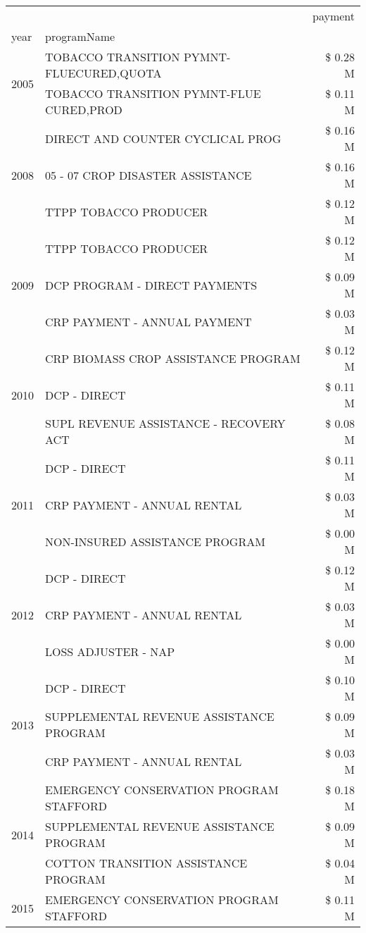 \begin{tabular}{llr}
\toprule
 &  & payment \\
year & programName &  \\
\midrule
\multirow[t]{2}{*}{2005} & TOBACCO TRANSITION PYMNT-FLUECURED,QUOTA & \$ 0.28 M \\
 & TOBACCO TRANSITION PYMNT-FLUE CURED,PROD & \$ 0.11 M \\
\cline{1-3}
\multirow[t]{3}{*}{2008} & DIRECT AND COUNTER CYCLICAL PROG & \$ 0.16 M \\
 & 05 - 07 CROP DISASTER ASSISTANCE & \$ 0.16 M \\
 & TTPP TOBACCO PRODUCER & \$ 0.12 M \\
\cline{1-3}
\multirow[t]{3}{*}{2009} & TTPP TOBACCO PRODUCER & \$ 0.12 M \\
 & DCP PROGRAM - DIRECT PAYMENTS & \$ 0.09 M \\
 & CRP PAYMENT - ANNUAL PAYMENT & \$ 0.03 M \\
\cline{1-3}
\multirow[t]{3}{*}{2010} & CRP BIOMASS CROP ASSISTANCE PROGRAM & \$ 0.12 M \\
 & DCP - DIRECT & \$ 0.11 M \\
 & SUPL REVENUE ASSISTANCE - RECOVERY ACT & \$ 0.08 M \\
\cline{1-3}
\multirow[t]{3}{*}{2011} & DCP - DIRECT & \$ 0.11 M \\
 & CRP PAYMENT - ANNUAL RENTAL & \$ 0.03 M \\
 & NON-INSURED ASSISTANCE PROGRAM & \$ 0.00 M \\
\cline{1-3}
\multirow[t]{3}{*}{2012} & DCP - DIRECT & \$ 0.12 M \\
 & CRP PAYMENT - ANNUAL RENTAL & \$ 0.03 M \\
 & LOSS ADJUSTER - NAP & \$ 0.00 M \\
\cline{1-3}
\multirow[t]{3}{*}{2013} & DCP - DIRECT & \$ 0.10 M \\
 & SUPPLEMENTAL REVENUE ASSISTANCE PROGRAM & \$ 0.09 M \\
 & CRP PAYMENT - ANNUAL RENTAL & \$ 0.03 M \\
\cline{1-3}
\multirow[t]{3}{*}{2014} & EMERGENCY CONSERVATION PROGRAM STAFFORD & \$ 0.18 M \\
 & SUPPLEMENTAL REVENUE ASSISTANCE PROGRAM & \$ 0.09 M \\
 & COTTON TRANSITION ASSISTANCE PROGRAM & \$ 0.04 M \\
\cline{1-3}
\multirow[t]{3}{*}{2015} & EMERGENCY CONSERVATION PROGRAM STAFFORD & \$ 0.11 M \\

\end{tabular}

